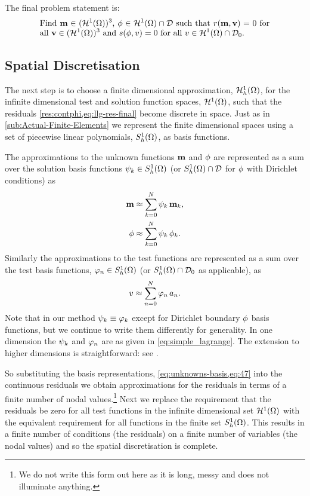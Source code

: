 The final problem statement is: 
\begin{equation}
  \eqpar{Find $\mv \in (\tsinf)^3$, $\phim \in \tsinf \cap \Dfs$ such that $\rllg(\mv, \testv) = 0$ for all $\testv \in (\tsinf)^3$ and $\rphi(\phim, \test) = 0$ for all $\test \in \tsinf \cap \Dfs_0$.}
\label{eq:inf-dim-problem}
\end{equation}




\subsection{Spatial Discretisation}
\label{sec:spat-discr-resi}

The next step is to choose a finite dimensional approximation, ${\mathcal{H}^1_h(\Omega)}$, for the infinite dimensional test and solution function spaces, ${\mathcal{H}^1(\Omega)}$, such that the residuals \cref{res:contphi,eq:llg-res-final} become discrete in space.
Just as in \cref{sub:Actual-Finite-Elements} we represent the finite dimensional spaces using a set of piecewise linear polynomials, ${S_h^1(\Omega)}$, as basis functions.

The approximations to the unknown functions $\mathbf{m}$ and $\phi$ are represented as a sum over the solution basis functions ${\psi_k} \in {S_h^1(\Omega)}$ (or ${S_h^1(\Omega)} \cap \mathcal{D}$ for $\phi$ with Dirichlet conditions) as
\begin{equation}
  \begin{aligned}
    \mathbf{m} &\approx \sum_{k = 0}^{N} {\psi_k} \, \mathbf{m}_k, \\
    \phi &\approx \sum_{k = 0}^{N} {\psi_k} \, \phi_{k}.
    \label{eq:unknowns-basis}
  \end{aligned}
\end{equation}
Similarly the approximations to the test functions are represented as a sum over the test basis functions, ${\varphi_n} \in {S_h^1(\Omega)}$ (or ${S_h^1(\Omega)} \cap \mathcal{D}_0$ as applicable), as
\begin{equation}
  \label{eq:47}
  v \approx \sum_{n = 0}^{N} {\varphi_n} \, a_n.
\end{equation}
Note that in our method $\psi_k \equiv \varphi_k$ except for Dirichlet boundary $\phi$ basis functions, but we continue to write them differently for generality.
In one dimension the ${\psi_k}$ and ${\varphi_n}$ are as given in \cref{eq:simple_lagrange}.
The extension to higher dimensions is straightforward: see \eg \cite[25]{HowardElmanDavidSilvester2006}.

So substituting the basis representations, \cref{eq:unknowns-basis,eq:47} into the continuous residuals we obtain approximations for the residuals in terms of a finite number of nodal values.\footnote{We do not write this form out here as it is long, messy and does not illuminate anything.}
Next we replace the requirement that the residuals be zero for all test functions in the infinite dimensional set ${\mathcal{H}^1(\Omega)}$ with the equivalent requirement for all functions in the finite set ${S_h^1(\Omega)}$. 
This results in a finite number of conditions (the residuals) on a finite number of variables (the nodal values) and so the spatial discretisation is complete.

